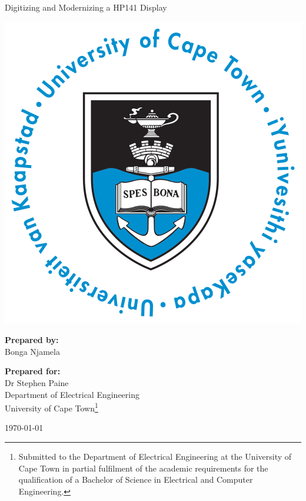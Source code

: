 \thispagestyle{empty}
\begin{center}
    
\Huge

\vspace{5cm}

Digitizing and Modernizing a HP141 Display

\vspace{2.5cm}

\includegraphics[width=0.4\linewidth]{FrontMatter/UCT_logo.png}

\vfill

\large
\textbf{Prepared by:}\\
Bonga Njamela

\vspace{1cm}

\textbf{Prepared for:}\\
Dr Stephen Paine\\
Department of Electrical Engineering\\
University of Cape Town\footnote{Submitted to the Department of Electrical Engineering at the University of Cape Town in partial fulfilment of the academic requirements for the qualification of a Bachelor of Science in Electrical and Computer Engineering.}

\vspace{2cm}

\today

\end{center}